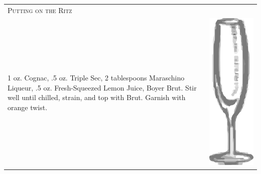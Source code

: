 \documentclass{article}
\begin{document}
\begin{tabular}{p{2in} p{0.5in}}
\multicolumn{2}{p{3in}}{\centering\Huge\textsc{Putting on the Ritz}} \\ 
   \vspace{-0.1in}1 oz. Cognac, .5 oz. Triple Sec, 2 tablespoons Maraschino Liqueur, .5 oz. Fresh-Squeezed Lemon Juice, Boyer Brut. Stir well until chilled, strain, and top with Brut. Garnish with orange twist. &
   \vspace{-0.1in} \includegraphics{flute.png}
\end{tabular}
\end{document}

